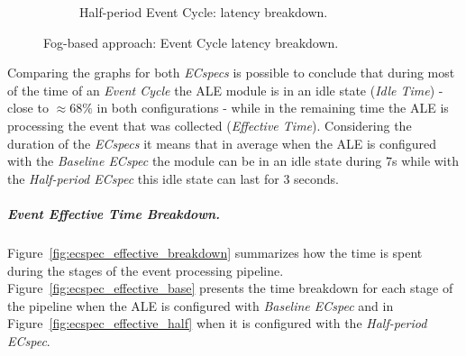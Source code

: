\begin{figure}[ht!]
\begin{subfigure}{.5\textwidth}
   \caption{Half-period Event Cycle: latency breakdown.}
   \label{fig:ecspec_half}
 \end{subfigure}
 \caption[Fog-based approach: event latency breakdown.]{Fog-based approach: Event Cycle latency breakdown.}
 \label{fig:ecspec_breakdown}
\end{figure}

Comparing the graphs for both \textit{ECspecs} is possible to conclude that during most of the time of
an \textit{Event Cycle} the \gls{ALE} module is in an idle state (\textit{Idle Time}) - close to $\approx68\%$
in both configurations - while in the remaining time the \gls{ALE} is processing the event that was
collected (\textit{Effective Time}). Considering the duration of the \textit{ECspecs} it means that in
average when the \gls{ALE} is configured with the \textit{Baseline ECspec} the module can be in an idle
state during 7s while with the \textit{Half-period ECspec} this idle state can last for 3 seconds.

\subparagraph{Event Effective Time Breakdown.}
\label{subp:fog_event_effective_breakdown}
Figure~\ref{fig:ecspec_effective_breakdown} summarizes how the time is spent during the stages of the
event processing pipeline. Figure~\ref{fig:ecspec_effective_base} presents the time breakdown for
each stage of the pipeline when the \gls{ALE} is configured with \textit{Baseline ECspec} and in
Figure~\ref{fig:ecspec_effective_half} when it is configured with the \textit{Half-period ECspec}.\\

